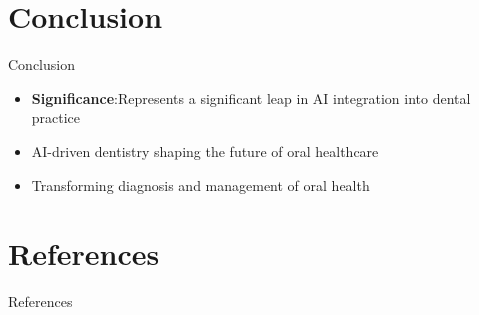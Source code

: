\documentclass{beamer}
\begin{document}
\section[Conclusion]{Conclusion}
\begin{frame}{Conclusion}
	\begin{itemize}
		\vfill
		\item \textbf{Significance}:Represents a significant leap in AI integration into dental practice
		\vfill
		\item AI-driven dentistry shaping the future of oral healthcare
		\vfill
		\item Transforming diagnosis and management of oral health
		
	\end{itemize}
\end{frame}
\section{References}

\begin{frame}[allowframebreaks]{References}
	\nocite{*}
    
    
\end{frame}
\end{document}
